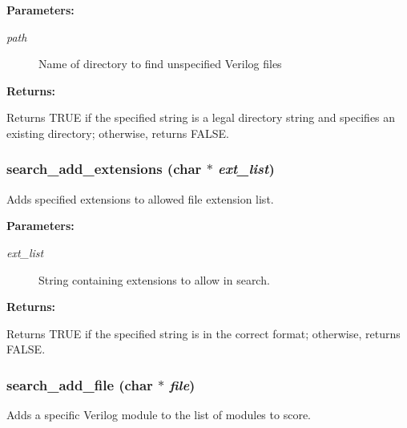 \begin{Desc}
\item[{\bf Parameters: }]\par
\begin{description}
\item[
{\em path}]Name of directory to find unspecified Verilog files \end{description}
\end{Desc}
\begin{Desc}
\item[{\bf Returns: }]\par
Returns TRUE if the specified string is a legal directory string and specifies an existing directory; otherwise, returns FALSE. \end{Desc}
\subsubsection{ search\_\-add\_\-extensions (char $\ast$ {\em ext\_\-list})}\label{search_8h_a5}


Adds specified extensions to allowed file extension list.

\begin{Desc}
\item[{\bf Parameters: }]\par
\begin{description}
\item[
{\em ext\_\-list}]String containing extensions to allow in search. \end{description}
\end{Desc}
\begin{Desc}
\item[{\bf Returns: }]\par
Returns TRUE if the specified string is in the correct format; otherwise, returns FALSE. \end{Desc}
\subsubsection{ search\_\-add\_\-file (char $\ast$ {\em file})}\label{search_8h_a3}


Adds a specific Verilog module to the list of modules to score.

